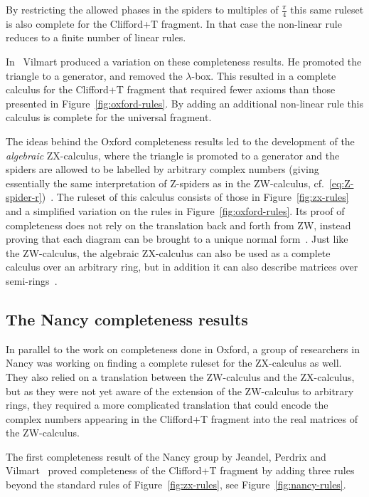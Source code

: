 \documentclass[a4paper,onecolumn,superscriptaddress,11pt,%
				unpublished,%
				allowfontchageintitle,%
				]{quantumarticle}
\begin{document}
By restricting the allowed phases in the spiders to multiples of $\frac\pi4$ this same ruleset is also complete for the Clifford+T fragment. In that case the non-linear rule reduces to a finite number of linear rules.

In~\cite{vilmartzxtriangle} Vilmart produced a variation on these completeness results. He promoted the triangle to a generator, and removed the $\lambda$-box. This resulted in a complete calculus for the Clifford+T fragment that required fewer axioms than those presented in Figure~\ref{fig:oxford-rules}. By adding an additional non-linear rule this calculus is complete for the universal fragment.

The ideas behind the Oxford completeness results led to the development of the \emph{algebraic} ZX-calculus, where the triangle is promoted to a generator and the spiders are allowed to be labelled by arbitrary complex numbers (giving essentially the same interpretation of Z-spiders as in the ZW-calculus, cf.~\eqref{eq:Z-spider-r})~\cite{algebraicZX}. The ruleset of this calculus consists of those in Figure~\ref{fig:zx-rules} and a simplified variation on the rules in Figure~\ref{fig:oxford-rules}. Its proof of completeness does not rely on the translation back and forth from ZW, instead proving that each diagram can be brought to a unique normal form~\cite{wang2020algebraic}.
Just like the ZW-calculus, the algebraic ZX-calculus can also be used as a complete calculus over an arbitrary ring, but in addition it can also describe matrices over semi-rings~\cite{ringZX}.

\subsection{The Nancy completeness results}\label{sec:completeness-nancy}

In parallel to the work on completeness done in Oxford, a group of researchers in Nancy was working on finding a complete ruleset for the ZX-calculus as well.
They also relied on a translation between the ZW-calculus and the ZX-calculus, but as they were not yet aware of the extension of the ZW-calculus to arbitrary rings, they required a more complicated translation that could encode the complex numbers appearing in the Clifford+T fragment into the real matrices of the ZW-calculus.

The first completeness result of the Nancy group by Jeandel, Perdrix and Vilmart~\cite{SimonCompleteness} proved completeness of the Clifford+T fragment by adding three rules beyond the standard rules of Figure~\ref{fig:zx-rules}, see Figure~\ref{fig:nancy-rules}.
\end{document}
